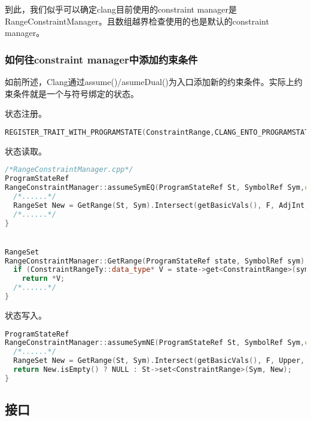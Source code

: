 \documentclass[a4paper]{article}
\begin{document}
到此，我们似乎可以确定clang目前使用的constraint manager是RangeConstraintManager。且数组越界检查使用的也是默认的constraint manager。
\subsubsection{如何往constraint manager中添加约束条件}
如前所述，Clang通过assume()/asumeDual()为入口添加新的约束条件。实际上约束条件就是一个与符号绑定的状态。


状态注册。
\begin{lstlisting}[language=C++]
REGISTER_TRAIT_WITH_PROGRAMSTATE(ConstraintRange,CLANG_ENTO_PROGRAMSTATE_MAP(SymbolRef,RangeSet))  
\end{lstlisting}


状态读取。
\begin{lstlisting}[language=C++]
/*RangeConstraintManager.cpp*/
ProgramStateRef 
RangeConstraintManager::assumeSymEQ(ProgramStateRef St, SymbolRef Sym,const llvm::APSInt &Int,const llvm::APSInt &Adjustment) {
  /*......*/
  RangeSet New = GetRange(St, Sym).Intersect(getBasicVals(), F, AdjInt, AdjInt);
  /*......*/
}


RangeSet
RangeConstraintManager::GetRange(ProgramStateRef state, SymbolRef sym) {
  if (ConstraintRangeTy::data_type* V = state->get<ConstraintRange>(sym))
    return *V;
  /*......*/
}  
\end{lstlisting}

状态写入。
\begin{lstlisting}[language=C++]
ProgramStateRef 
RangeConstraintManager::assumeSymNE(ProgramStateRef St, SymbolRef Sym,const llvm::APSInt &Int,const llvm::APSInt &Adjustment) {
  /*......*/
  RangeSet New = GetRange(St, Sym).Intersect(getBasicVals(), F, Upper, Lower);
  return New.isEmpty() ? NULL : St->set<ConstraintRange>(Sym, New);
}
\end{lstlisting}

  \subsection{接口}
  
  
  
\end{document}
